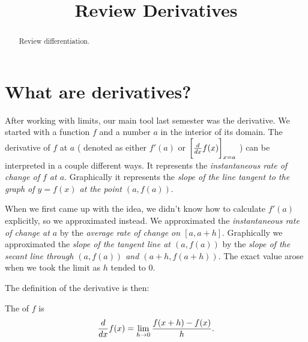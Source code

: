 \documentclass{ximera}
\title[Dig-In:]{Review Derivatives}
\begin{document}
\begin{abstract}
  Review differentiation.
\end{abstract}
\maketitle


\section{What are derivatives?}
After working with limits, our main tool last semester was the derivative.  We started with a function $f$ and a number $a$ in the
interior of its domain.  The derivative of $f$ at $a$ ( denoted as either $f'(a)$ or $\bigg[  \frac{d}{\mathop{}\!d x} f(x) \bigg]_{x=a}$ ) can be interpreted
in a couple different ways.  It represents the \emph{instantaneous rate of change of $f$ at $a$}.  Graphically it represents
the \emph{slope of the line tangent to the graph of $y=f(x)$ at the point $(a, f(a) )$}. 

When we first came up with the idea, we didn't know how to calculate $f'(a)$ explicitly, so we approximated instead.  We
approximated the \emph{instantaneous rate of change at $a$} by the \emph{average rate of change on $[a, a+h]$}.  Graphically
we approximated the \emph{slope of the tangent line at $(a,f(a))$} by the \emph{slope of the secant line through $(a, f(a))$ and $(a+h, f(a+h))$}.
The exact value arose when we took the limit as $h$ tended to $0$.

The definition of the derivative is then:
\begin{definition}
  The  of $f$ is 
  \[
  \frac{d}{\mathop{}\!d x} f(x) = \lim_{h\to 0} \frac{f(x+h) - f(x)}{h}.
  \]
\end{definition}
\end{document}
